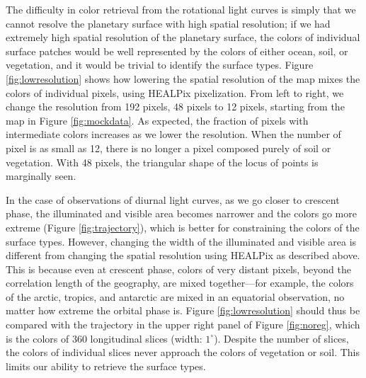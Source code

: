 \documentclass[iop,numberedappendix,apj,]{emulateapj}
\begin{document}
The difficulty in color retrieval from the rotational light curves is simply that we cannot resolve the planetary surface with high spatial resolution; if we had extremely high spatial resolution of the planetary surface, the colors of individual surface patches would be well represented by the colors of either ocean, soil, or vegetation, and it would be trivial to identify the surface types. 
Figure \ref{fig:lowresolution} shows how lowering the spatial resolution of the map mixes the colors of individual pixels, using HEALPix pixelization. 
From left to right, we change the resolution from 192 pixels, 48 pixels to 12 pixels, starting from the map in Figure \ref{fig:mockdata}. 
As expected, the fraction of pixels with intermediate colors increases as we lower the resolution. 
When the number of pixel is as small as 12, there is no longer a pixel composed purely of soil or vegetation. 
With 48 pixels, the triangular shape of the locus of points is marginally seen. 

In the case of observations of diurnal light curves, as we go closer to crescent phase, the illuminated and visible area becomes narrower and the colors go more extreme (Figure \ref{fig:trajectory}), which is better for   constraining the colors of the surface types. 
However, changing the width of the illuminated and visible area is different from changing the spatial resolution using HEALPix as described above. 
This is because even at crescent phase, colors of very distant pixels, beyond the correlation length of the geography, are mixed together---for example, the colors of the arctic, tropics, and antarctic are mixed in an equatorial observation, no matter how extreme the orbital phase is. 
Figure \ref{fig:lowresolution} should thus be compared with the trajectory in the upper right panel of Figure \ref{fig:noreg}, which is the colors of 360 longitudinal slices (width: $1^{\circ }$). 
Despite the number of slices, the colors of individual slices never approach the colors of vegetation or soil. 
This limits our ability to retrieve the surface types. 
\end{document}
